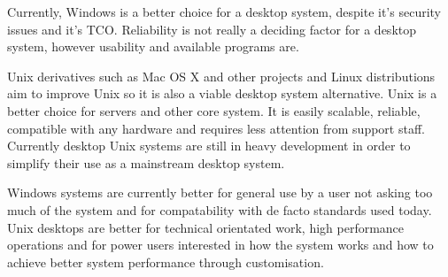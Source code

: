 \documentclass[a4paper,12pt]{article}
\begin{document}
Currently, Windows is a better choice for a desktop system, despite it's
security issues and it's TCO. Reliability is not really a deciding
factor for a desktop system, however usability and available programs
are.

Unix derivatives such as Mac OS X and other projects and Linux
distributions aim to improve Unix so it is also a viable desktop system 
alternative. Unix is a better choice for servers and other core system. 
It is easily scalable, reliable, compatible with any hardware and requires 
less attention from support staff. Currently desktop Unix systems are
still in heavy development in order to simplify their use as a
mainstream desktop system.

Windows systems are currently better for general use by a user not
asking too much of the system and for compatability with de facto
standards used today. Unix desktops are better for technical 
orientated work, high performance operations and for power users 
interested in how the system works and how to achieve better system 
performance through customisation.
\end{document}
